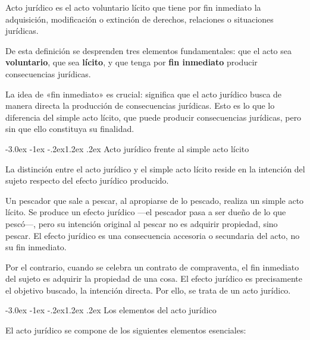 \documentclass[12pt,oneside]{book}
\makeatletter
\renewcommand\section{\@startsection{section}{1}{\z@}%
  {-3.0ex \@plus -1ex \@minus -.2ex}{1.2ex \@plus .2ex}%
  {\normalfont\large\bfseries\color{acento}}}
\makeatother
\begin{document}
\begin{definicion}
Acto jurídico es el acto voluntario lícito que tiene por fin inmediato la adquisición, modificación o extinción de derechos, relaciones o situaciones jurídicas.
\end{definicion}

De esta definición se desprenden tres elementos fundamentales: que el acto sea \textbf{voluntario}, que sea \textbf{lícito}, y que tenga por \textbf{fin inmediato} producir consecuencias jurídicas.

\begin{importante}
La idea de «fin inmediato» es crucial: significa que el acto jurídico busca de manera directa la producción de consecuencias jurídicas. Esto es lo que lo diferencia del simple acto lícito, que puede producir consecuencias jurídicas, pero sin que ello constituya su finalidad.
\end{importante}

\section{Acto jurídico frente al simple acto lícito}

La distinción entre el acto jurídico y el simple acto lícito reside en la intención del sujeto respecto del efecto jurídico producido.

\begin{ejemplo}[{El pescador}]
Un pescador que sale a pescar, al apropiarse de lo pescado, realiza un simple acto lícito. Se produce un efecto jurídico ---el pescador pasa a ser dueño de lo que pescó---, pero su intención original al pescar no es adquirir propiedad, sino pescar. El efecto jurídico es una consecuencia accesoria o secundaria del acto, no su fin inmediato.

Por el contrario, cuando se celebra un contrato de compraventa, el fin inmediato del sujeto es adquirir la propiedad de una cosa. El efecto jurídico es precisamente el objetivo buscado, la intención directa. Por ello, se trata de un acto jurídico.
\end{ejemplo}

\section{Los elementos del acto jurídico}

El acto jurídico se compone de los siguientes elementos esenciales:
\end{document}
